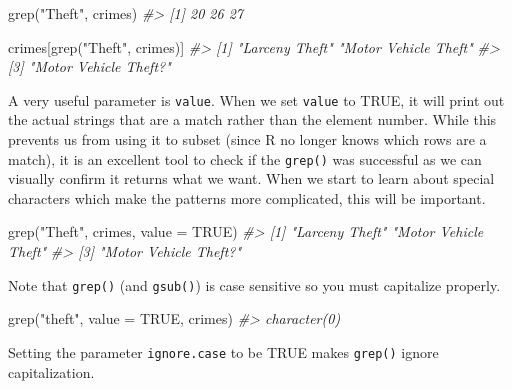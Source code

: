 \documentclass[
]{krantz}
\makeatletter
\newenvironment{Shaded}{\begin{snugshade}}{\end{snugshade}}
\newcommand{\AttributeTok}[1]{\textcolor[rgb]{0.61,0.61,0.61}{#1}}
\newcommand{\CommentTok}[1]{\textcolor[rgb]{0.37,0.37,0.37}{\textit{#1}}}
\newcommand{\ConstantTok}[1]{\textcolor[rgb]{0,0,0}{#1}}
\newcommand{\FunctionTok}[1]{\textcolor[rgb]{0,0,0}{#1}}
\newcommand{\NormalTok}[1]{#1}
\newcommand{\StringTok}[1]{\textcolor[rgb]{0.5,0.5,0.5}{#1}}
\newenvironment{kframe}{%
\medskip{}
\setlength{\fboxsep}{.8em}
 \def\at@end@of@kframe{}%
 \ifinner\ifhmode%
  \def\at@end@of@kframe{\end{minipage}}%
  \begin{minipage}{\columnwidth}%
 \fi\fi%
 \def\FrameCommand##1{\hskip\@totalleftmargin \hskip-\fboxsep
 \colorbox{shadecolor}{##1}\hskip-\fboxsep
     \hskip-\linewidth \hskip-\@totalleftmargin \hskip\columnwidth}%
 \MakeFramed {\advance\hsize-\width
   \@totalleftmargin\z@ \linewidth\hsize
   \@setminipage}}%
 {\par\unskip\endMakeFramed%
 \at@end@of@kframe}
\renewenvironment{Shaded}{\begin{kframe}}{\end{kframe}}
\makeatother
\begin{document}
\begin{Shaded}
\begin{Highlighting}[]
\FunctionTok{grep}\NormalTok{(}\StringTok{"Theft"}\NormalTok{, crimes)}
\CommentTok{\#\textgreater{} [1] 20 26 27}
\end{Highlighting}
\end{Shaded}

\begin{Shaded}
\begin{Highlighting}[]
\NormalTok{crimes[}\FunctionTok{grep}\NormalTok{(}\StringTok{"Theft"}\NormalTok{, crimes)]}
\CommentTok{\#\textgreater{} [1] "Larceny Theft"        "Motor Vehicle Theft" }
\CommentTok{\#\textgreater{} [3] "Motor Vehicle Theft?"}
\end{Highlighting}
\end{Shaded}

A very useful parameter is \texttt{value}. When we set \texttt{value} to TRUE, it will print out the actual strings that are a match rather than the element number. While this prevents us from using it to subset (since R no longer knows which rows are a match), it is an excellent tool to check if the \texttt{grep()} was successful as we can visually confirm it returns what we want. When we start to learn about special characters which make the patterns more complicated, this will be important.

\begin{Shaded}
\begin{Highlighting}[]
\FunctionTok{grep}\NormalTok{(}\StringTok{"Theft"}\NormalTok{, crimes, }\AttributeTok{value =} \ConstantTok{TRUE}\NormalTok{)}
\CommentTok{\#\textgreater{} [1] "Larceny Theft"        "Motor Vehicle Theft" }
\CommentTok{\#\textgreater{} [3] "Motor Vehicle Theft?"}
\end{Highlighting}
\end{Shaded}

Note that \texttt{grep()} (and \texttt{gsub()}) is case sensitive so you must capitalize properly.

\begin{Shaded}
\begin{Highlighting}[]
\FunctionTok{grep}\NormalTok{(}\StringTok{"theft"}\NormalTok{, }\AttributeTok{value =} \ConstantTok{TRUE}\NormalTok{, crimes)}
\CommentTok{\#\textgreater{} character(0)}
\end{Highlighting}
\end{Shaded}

Setting the parameter \texttt{ignore.case} to be TRUE makes \texttt{grep()} ignore capitalization.
\end{document}
